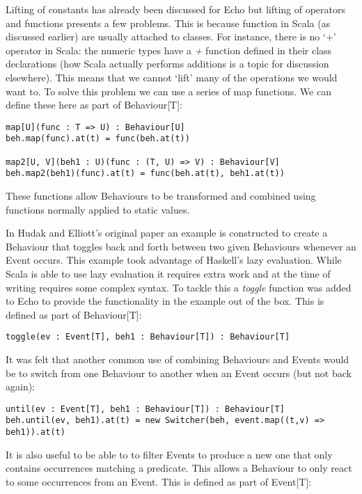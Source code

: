       Lifting of constants has already been discussed for Echo but lifting of operators and
      functions presents a few problems. This is because function in Scala (as discussed earlier)
      are usually attached to classes. For instance, there is no `+' operator in Scala: the numeric
      types have a \emph{+} function defined in their class declarations (how Scala actually performs additions
      is a topic for discussion elsewhere). This means that we cannot `lift' many of the operations we
      would want to. To solve this problem we can use a series of map functions. We can define these
      here as part of Behaviour[T]:

\begin{verbatim}
map[U](func : T => U) : Behaviour[U]
beh.map(func).at(t) = func(beh.at(t))

map2[U, V](beh1 : U)(func : (T, U) => V) : Behaviour[V]
beh.map2(beh1)(func).at(t) = func(beh.at(t), beh1.at(t))
\end{verbatim}        

      These functions allow Behaviours to be transformed and combined using functions
      normally applied to static values.
      
      In Hudak and Elliott's original paper an example is constructed to create a Behaviour
      that toggles back and forth between two given Behaviours whenever an Event occurs. This
      example took advantage of Haskell's lazy evaluation. While Scala is able to use lazy evaluation
      it requires extra work and at the time of writing requires some complex syntax. To tackle this
      a \emph{toggle} function was added to Echo to provide the functionality in the example out of the box.
      This is defined as part of Behaviour[T]:
      
\begin{verbatim}
toggle(ev : Event[T], beh1 : Behaviour[T]) : Behaviour[T]
\end{verbatim}        
      
      It was felt that another common use of combining Behaviours and Events would be
      to switch from one Behaviour to another when an Event occurs (but not back again):

\begin{verbatim}
until(ev : Event[T], beh1 : Behaviour[T]) : Behaviour[T]
beh.until(ev, beh1).at(t) = new Switcher(beh, event.map((t,v) => beh1)).at(t)
\end{verbatim}        
      
      It is also useful to be able to to filter Events to produce a new one that only
      contains occurrences matching a predicate. This allows a Behaviour to only react
      to some occurrences from an Event. This is defined as part of Event[T]:

